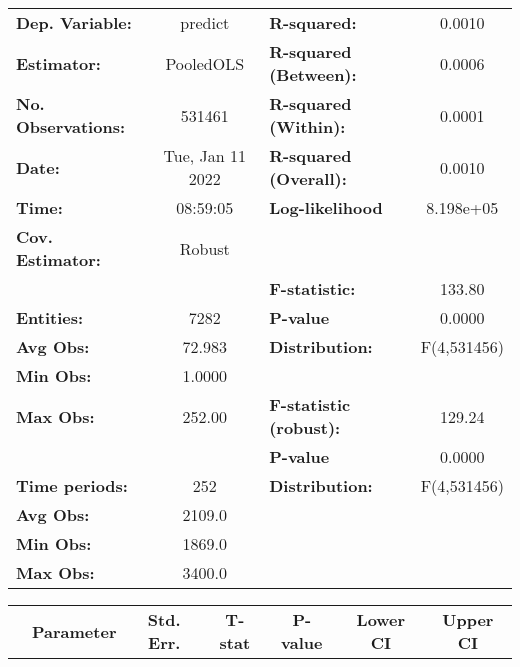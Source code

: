 \begin{center}
\begin{tabular}{lclc}
\toprule
\textbf{Dep. Variable:}    &      predict       & \textbf{  R-squared:         }   &      0.0010      \\
\textbf{Estimator:}        &     PooledOLS      & \textbf{  R-squared (Between):}  &      0.0006      \\
\textbf{No. Observations:} &       531461       & \textbf{  R-squared (Within):}   &      0.0001      \\
\textbf{Date:}             &  Tue, Jan 11 2022  & \textbf{  R-squared (Overall):}  &      0.0010      \\
\textbf{Time:}             &      08:59:05      & \textbf{  Log-likelihood     }   &    8.198e+05     \\
\textbf{Cov. Estimator:}   &       Robust       & \textbf{                     }   &                  \\
\textbf{}                  &                    & \textbf{  F-statistic:       }   &      133.80      \\
\textbf{Entities:}         &        7282        & \textbf{  P-value            }   &      0.0000      \\
\textbf{Avg Obs:}          &       72.983       & \textbf{  Distribution:      }   &   F(4,531456)    \\
\textbf{Min Obs:}          &       1.0000       & \textbf{                     }   &                  \\
\textbf{Max Obs:}          &       252.00       & \textbf{  F-statistic (robust):} &      129.24      \\
\textbf{}                  &                    & \textbf{  P-value            }   &      0.0000      \\
\textbf{Time periods:}     &        252         & \textbf{  Distribution:      }   &   F(4,531456)    \\
\textbf{Avg Obs:}          &       2109.0       & \textbf{                     }   &                  \\
\textbf{Min Obs:}          &       1869.0       & \textbf{                     }   &                  \\
\textbf{Max Obs:}          &       3400.0       & \textbf{                     }   &                  \\
\bottomrule
\end{tabular}
\begin{tabular}{lcccccc}
                & \textbf{Parameter} & \textbf{Std. Err.} & \textbf{T-stat} & \textbf{P-value} & \textbf{Lower CI} & \textbf{Upper CI}  \\

\end{tabular}
\end{center}
